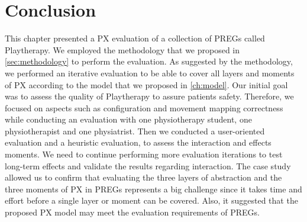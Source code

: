 \section{Conclusion}
This chapter presented a \ac{PX} evaluation of a collection of \acp{PREG} called Playtherapy. We employed the methodology that we proposed in \autoref{sec:methodology} to perform the evaluation. As suggested by the methodology, we performed an iterative evaluation to be able to cover all layers and moments of \ac{PX} according to the model that we proposed in \autoref{ch:model}. Our initial goal was to assess the quality of Playtherapy to assure patients safety. Therefore, we focused on aspects such as configuration and movement mapping correctness while conducting an evaluation with one physiotherapy student, one physiotherapist and one physiatrist. Then we conducted a user-oriented evaluation and a heuristic evaluation, to assess the interaction and effects moments. We need to continue performing more evaluation iterations to test long-term effects and validate the results regarding interaction. The case study allowed us to confirm that evaluating the three layers of abstraction and the three moments of \ac{PX} in \acp{PREG} represents a big challenge since it takes time and effort before a single layer or moment can be covered. Also, it suggested that the proposed \ac{PX} model may meet the evaluation requirements of \acp{PREG}.